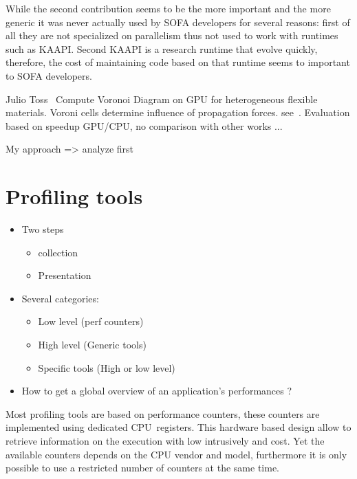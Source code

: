 While the second contribution seems to be the more important and the more
generic it was never actually used by \gls{SOFA} developers for several
reasons: first of all they are not specialized on parallelism thus not used to
work with runtimes such as \gls{KAAPI}. Second \gls{KAAPI} is a research
runtime that evolve quickly, therefore, the cost of maintaining code based on
that runtime seems to important to \gls{SOFA} developers.


Julio Toss~\cite{Toss13Parallel,Toss14Parallel} Compute Voronoi Diagram on GPU for
heterogeneous flexible materials. Voroni cells determine influence of
propagation forces. see~\cite{Faure11Sparse}. Evaluation based on
speedup GPU/CPU, no comparison with other works ...

My approach => analyze first

\section{Profiling tools}
\label{sec:prof-tools}


\begin{itemize}
    \item Two steps
        \begin{itemize}
            \item collection
            \item Presentation
        \end{itemize}
    \item Several categories:
        \begin{itemize}
            \item Low level (perf counters)
            \item High level (Generic tools)
            \item Specific tools (High or low level)
        \end{itemize}
    \item How to get a global overview of an application's performances ?
\end{itemize}

Most profiling tools are based on performance counters, these counters are
implemented using dedicated \gls{CPU} registers. This hardware based design
allow to retrieve information on the execution with low intrusively and cost.
Yet the available counters depends on the \gls{CPU} vendor and model,
furthermore it is only possible to use a restricted number of counters at
the same time.

